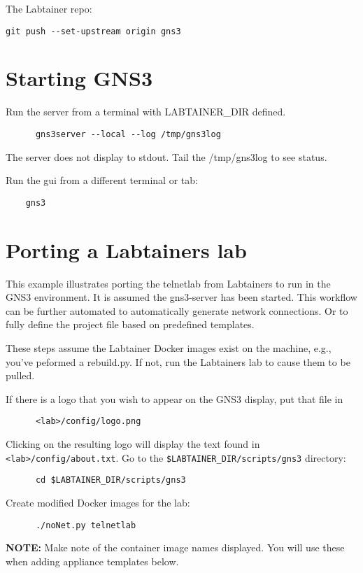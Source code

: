 \documentclass[12pt]{article}
\begin{document}
\noindent The Labtainer repo:
\begin{verbatim}
git push --set-upstream origin gns3
\end{verbatim}

\section{Starting GNS3}
Run the server from a terminal with LABTAINER\_DIR defined.

\begin{verbatim}
      gns3server --local --log /tmp/gns3log
\end{verbatim}
\noindent The server does not display to stdout.  Tail the /tmp/gns3log to see status.

\noindent Run the gui from a different terminal or tab:
\begin{verbatim}
    gns3
\end{verbatim}

\section{Porting a Labtainers lab}
This example illustrates porting the telnetlab from Labtainers to run in the GNS3 environment.
It is assumed the gns3-server has been started.
This workflow can be further automated to automatically generate network connections.  Or to fully define the project
file based on predefined templates.

These steps assume the Labtainer Docker images exist on the machine, e.g., you've peformed a rebuild.py.  If not, run the Labtainers lab
to cause them to be pulled. 

\bigskip
If there is a logo that you wish to appear on the GNS3 display, put that file in 
\begin{verbatim}
      <lab>/config/logo.png
\end{verbatim}

\noindent Clicking on the resulting logo will display the text found in {\tt <lab>/config/about.txt}.
\bigskip
Go to the {\tt \$LABTAINER\_DIR/scripts/gns3} directory:
\begin{verbatim}
      cd $LABTAINER_DIR/scripts/gns3
\end{verbatim}

Create modified Docker images for the lab:
\begin{verbatim}
      ./noNet.py telnetlab
\end{verbatim}
\noindent \textbf{NOTE:} Make note of the container image names displayed.  You will use these when adding appliance templates below.
\end{document}
